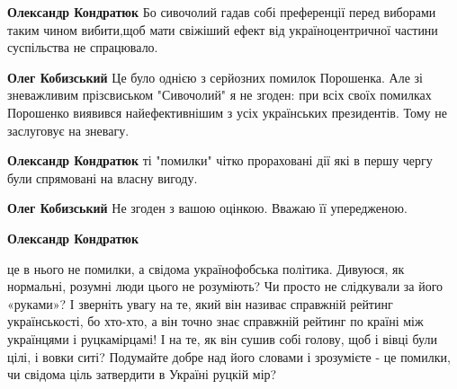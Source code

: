 \begin{itemize}
\begin{itemize}
 
\textbf{Олександр Кондратюк} Бо сивочолий гадав собі преференції перед виборами таким чином вибити,щоб мати свіжіший ефект від україноцентричної частини суспільства не спрацювало.

 
\textbf{Олег Кобизський} Це було однією з серйозних помилок Порошенка. Але зі зневажливим прізсвиськом "Сивочолий" я не згоден: при всіх своїх помилках Порошенко виявився найефективнішим з усіх українських президентів. Тому не заслуговує на зневагу.

 
\textbf{Олександр Кондратюк} ті "помилки" чітко прораховані дії які в першу чергу були спрямовані на власну вигоду.

 
\textbf{Олег Кобизський} Не згоден з вашою оцінкою. Вважаю її упередженою.

 
\textbf{Олександр Кондратюк} 

це в нього не помилки, а свідома українофобська політика. Дивуюся, як
нормальні, розумні люди цього не розуміють? Чи просто не слідкували за його
«руками»? І зверніть увагу на те, який він називає справжній рейтинг
українськості, бо хто-хто, а він точно знає справжній рейтинг по країні між
українцями і руцкамірцамі! І на те, як він сушив собі голову, щоб і вівці були
цілі, і вовки ситі? Подумайте добре над його словами і зрозумієте - це помилки,
чи свідома ціль затвердити в Україні руцкій мір?


\end{itemize}
\end{itemize}
